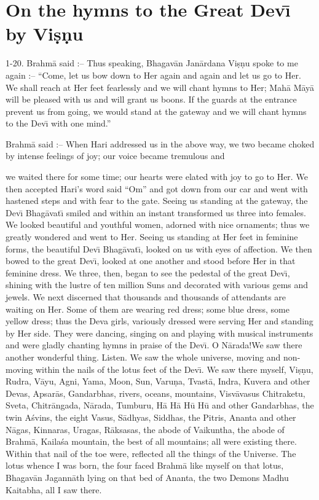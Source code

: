 \chapter{On the hymns to the Great Dev\={\i} by Vi\d{s}\d{n}u}

1-20. Brahm\=a said :-- Thus speaking, Bhagav\=an Jan\=ardana Vi\d{s}\d{n}u spoke to me again :-- ``Come, let us bow down to Her again and again and let us go to Her. We shall reach at Her feet fearlessly and we will chant hymns to Her; Mah\=a M\=ay\=a will be pleased with us and will grant us boons. If the guards at the entrance prevent us from going, we would stand at the gateway and we will chant hymns to the Dev\={\i} with one mind.''

Brahm\=a said :-- When Hari addressed us in the above way, we two became choked by intense feelings of joy; our voice became tremulous and

we waited there for some time; our hearts were elated with joy to go to Her. We then accepted Hari's word said ``Om'' and got down from our car and went with hastened steps and with fear to the gate. Seeing us standing at the gateway, the Dev\={\i} Bhag\=avat\={\i} smiled and within an instant transformed us three into females. We looked beautiful and youthful women, adorned with nice ornaments; thus we greatly wondered and went to Her. Seeing us standing at Her feet in feminine forms, the beautiful Dev\={\i} Bhag\=avat\={\i}, looked on us with eyes of affection. We then bowed to the great Dev\={\i}, looked at one another and stood before Her in that feminine dress. We three, then, began to see the pedestal of the great Dev\={\i}, shining with the lustre of ten million Suns and decorated with various gems and jewels. We next discerned that thousands and thousands of attendants are waiting on Her. Some of them are wearing red dress; some blue dress, some yellow dress; thus the Deva girls, variously dressed were serving Her and standing by Her side. They were dancing, singing on and playing with musical instruments and were gladly chanting hymns in praise of the Dev\={\i}. O N\=arada!We saw there another wonderful thing. Listen. We saw the whole universe, moving and non-moving within the nails of the lotus feet of the Dev\={\i}. We saw there myself, Vi\d{s}\d{n}u, Rudra, V\=ayu, Agni, Yama, Moon, Sun, Varu\d{n}a, Tvast\=a, Indra, Kuvera and other Devas, Apsar\=as, Gandarbhas, rivers, oceans, mountains, Visv\=avasus Chitraketu, Sveta, Chitr\=angada, N\=arada, Tumburu, H\=a H\=a H\=u H\=u and other Gandarbhas, the twin A\'svins, the eight Vasus, S\=adhyas, Siddhas, the Pitris, Ananta and other N\=agas, Kinnaras, Uragas, R\=aksasas, the abode of Vaikuntha, the abode of Brahm\=a, Kaila\'sa mountain, the best of all mountains; all were existing there. Within that nail of the toe were, reflected all the things of the Universe. The lotus whence I was born, the four faced Brahm\=a like myself on that lotus, Bhagav\=an Jagann\=ath lying on that bed of Ananta, the two Demons Madhu Kaitabha, all I saw there.

